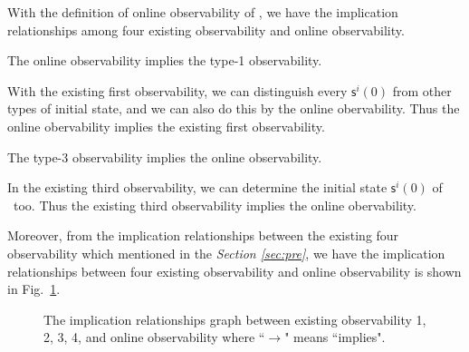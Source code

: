 With the definition of online observability of \BCNs, we have the implication relationships among four existing observability and online observability.

\begin{lemma}
The online observability implies the  type-1 observability.
\label{lemm:3}
\end{lemma}

With the existing first observability, we can distinguish every $\mathsf{s}^{i}(0)$ from other types of initial state, and we can also do this by the online obervability. Thus the online obervability implies the existing first observability. 

\begin{lemma}
The  type-3 observability implies the online observability.
\label{lemm:4}
\end{lemma}

In the existing third observability, we can determine the initial state $\mathsf{s}^{i}(0)$ of \BCN\ too. Thus the existing third observability implies the online obervability.

Moreover, from the implication relationships between the existing four observability which mentioned in the {\em Section \ref{sec:pre}}, we have the implication relationships between four existing observability and online observability is shown in Fig.~\ref{fig:7}.

\begin{figure}[thpb]
      \centering
      \caption{The implication relationships graph between existing observability 1, 2, 3, 4, and online observability where ``$\rightarrow$" means ``implies".}
      \label{fig:7}
   \end{figure}


   